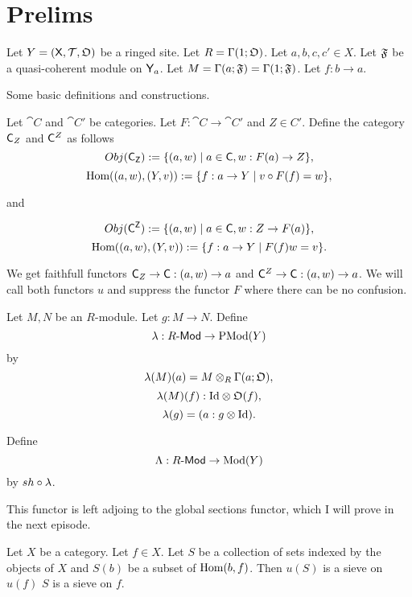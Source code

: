 



\section*{Prelims}

Let $Y = ({\mathsf{X}}, {\mathcal{T}}, {\mathfrak{O}})$ be a ringed site.
Let $R = \globalsections{O}$. Let $a,b,c,c'\in X$.
Let $\mathfrak{F}$ be a quasi-coherent module on ${\mathsf{Y}}_{a}$.
Let $M = \sections{a}{F} = \globalsections{F}$.
Let $f:b \rightarrow a$.

Some basic definitions and constructions.

\begin{definition}
Let $\cat{C}$ and $\cat{C'}$ be categories. Let $F:\cat{C}\rightarrow \cat{C'}$ and $Z\in C'$. 
Define the category ${\mathsf{C}}_{Z}$ and ${\mathsf{C}}^{Z}$ as follows
\[Obj({\mathsf{{\mathsf{C}}_{Z}}}) := \{(a,w) \mid a\in {\ensuremath{\mathsf{C}}}, w:F(a)\rightarrow Z\},\]
\[\mbox{Hom}((a,w),(Y,v)) := \{f:a\rightarrow Y \mid v\circ F(f) = w  \},\]

and

\[Obj({\mathsf{{\mathsf{C}}^{Z}}}) := \{(a,w) \mid a\in {\ensuremath{\mathsf{C}}}, w:Z\rightarrow F(a)\},\]
\[\mbox{Hom}((a,w),(Y,v)) := \{f:a\rightarrow Y \mid F(f)w = v  \}.\]

We get faithfull functors 
${\mathsf{C}}_{Z} \rightarrow {\ensuremath{\mathsf{C}}}: (a,w)\rightarrow a$ and 
${\mathsf{C}}^{Z} \rightarrow {\ensuremath{\mathsf{C}}}: (a,w)\rightarrow a$.
We will call both functors $u$ and suppress the functor $F$ where there can be no confusion.
\end{definition}


\begin{definition}
Let $M,N$ be an $R$-module.
Let $g:M \rightarrow N$.
Define 
\[\pstilde: \modules{R} \rightarrow \pshmodules{Y}\]
by
\[\pstilde(M)(a) = M \tensor_R \sections{a}{O} ,\]
\[\pstilde(M)(f): \id \tensor \sheaf{O}(f) ,\]
\[\pstilde(g) = (a: g \tensor \id ).\]
\end{definition}

\begin{definition}
Define
\[\stilde: \modules{R} \rightarrow \shmodules{Y}\]
by
$\sheafify \circ \pstilde$.
\end{definition}

This functor is left adjoing to the global sections functor, which I will prove in the next episode.



\begin{lemma}
Let $X$ be a category.
Let $f\in X$.
Let $S$ be a collection of sets indexed by the objects of $X$
and $S(b)$ be a subset of $\mbox{Hom}(b,f)$.
Then $u(S)$ is a sieve on $u(f)$ \iff $S$ is a sieve on $f$.
\end{lemma}

